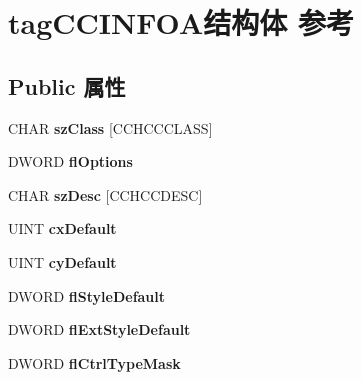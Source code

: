 \hypertarget{structtag_c_c_i_n_f_o_a}{}\section{tag\+C\+C\+I\+N\+F\+O\+A结构体 参考}
\label{structtag_c_c_i_n_f_o_a}
\subsection*{Public 属性}
\begin{DoxyCompactItemize}
\item 
\mbox{\label{structtag_c_c_i_n_f_o_a_a042e6e5ef3600843ffb71f38fd3c391d}} 
C\+H\+AR {\bfseries sz\+Class} \mbox{[}C\+C\+H\+C\+C\+C\+L\+A\+SS\mbox{]}
\item 
\mbox{\label{structtag_c_c_i_n_f_o_a_ab31749f7f7949b1c1fa347e5a9aed674}} 
D\+W\+O\+RD {\bfseries fl\+Options}
\item 
\mbox{\label{structtag_c_c_i_n_f_o_a_a1ab8972bf731f1e45ca6fce050eb7206}} 
C\+H\+AR {\bfseries sz\+Desc} \mbox{[}C\+C\+H\+C\+C\+D\+E\+SC\mbox{]}
\item 
\mbox{\label{structtag_c_c_i_n_f_o_a_af4ab94547ca752d97a8c522f60383b9c}} 
U\+I\+NT {\bfseries cx\+Default}
\item 
\mbox{\label{structtag_c_c_i_n_f_o_a_aba0f40ad9a9dde2086426d018f7488d8}} 
U\+I\+NT {\bfseries cy\+Default}
\item 
\mbox{\label{structtag_c_c_i_n_f_o_a_af744e6850a846f1964b63b8a494f9379}} 
D\+W\+O\+RD {\bfseries fl\+Style\+Default}
\item 
\mbox{\label{structtag_c_c_i_n_f_o_a_a33ce9b560c53a8a01c09ca1ea7cd3c43}} 
D\+W\+O\+RD {\bfseries fl\+Ext\+Style\+Default}
\item 
\mbox{\label{structtag_c_c_i_n_f_o_a_aee4a7e96849153841bfff8f01a33db0c}} 
D\+W\+O\+RD {\bfseries fl\+Ctrl\+Type\+Mask}
\item 
\mbox{\label{structtag_c_c_i_n_f_o_a_a2bc77ebed88ebebdf6bff75494bf0283}} 

\end{DoxyCompactItemize}
